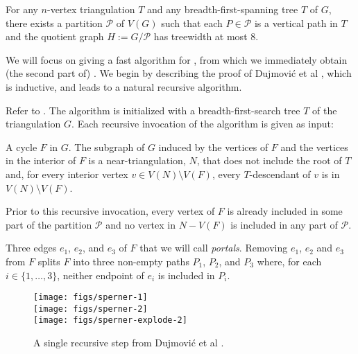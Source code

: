 \documentclass[kpfonts]{patmorin}
\begin{document}
\begin{thm}
  For any $n$-vertex triangulation $T$ and any breadth-first-spanning tree $T$ of $G$, there exists a partition $\mathcal{P}$ of $V(G)$ such that each $P\in\mathcal{P}$ is a vertical path in $T$ and the quotient graph $H:=G/\mathcal{P}$ has treewidth at most $8$.
\end{thm}

We will focus on giving a fast algorithm for , from which we immediately obtain (the second part of) .  We begin by describing the proof of Dujmović et al \cite{dujmovic.joret.ea:planar}, which is inductive, and leads to a natural recursive algorithm.

Refer to . The algorithm is initialized with a breadth-first-search tree $T$ of the triangulation $G$.  Each recursive invocation of the algorithm is given as input:
\begin{compactenum}
  \item A cycle $F$ in $G$. The subgraph of $G$ induced by the vertices of $F$ and the vertices in the interior of $F$ is a near-triangulation, $N$, that does not include the root of $T$ and, for every interior vertex $v\in V(N)\setminus V(F)$, every $T$-descendant of $v$ is in $V(N)\setminus V(F)$.
  
  Prior to this recursive invocation, every vertex of $F$ is already included in some part of the partition $\mathcal{P}$ and no vertex in $N-V(F)$ is included in any part of $\mathcal{P}$.

  \item Three edges $e_1$, $e_2$, and $e_3$ of $F$ that we will call \emph{portals}.  Removing $e_1$, $e_2$ and $e_3$ from $F$ splits $F$ into three non-empty paths $P_1$, $P_2$, and $P_3$ where, for each $i\in\{1,\ldots,3\}$, neither endpoint of $e_i$ is included in $P_i$.
\end{compactenum}

\begin{figure}
  \begin{center}
    \texttt{[image: figs/sperner-1]} \\[1ex]
    \texttt{[image: figs/sperner-2]} \\[1ex]
    \texttt{[image: figs/sperner-explode-2]}
  \end{center}
  \caption{A single recursive step from Dujmović et al \cite{dujmovic.joret.ea:planar}.}
\end{figure}
\end{document}

